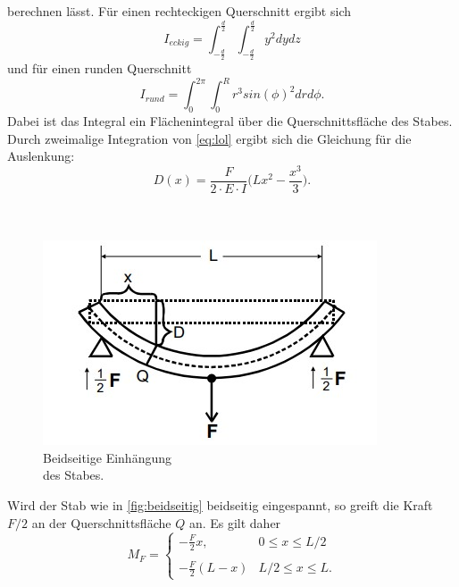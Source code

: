 berechnen lässt.
Für einen rechteckigen Querschnitt ergibt sich 
\begin{equation*}
    I_{eckig} =  \int_{-\frac{d}{2}}^{\frac{d}{2}}\int_{-\frac{d}{2}}^{\frac{d}{2}} y^2 dydz
\end{equation*}
und für einen runden Querschnitt
\begin{equation*}
    I_{rund} =  \int_{0}^{2π}\int_{0}^{R} r^3 sin(\phi)^2 drd\phi.
\end{equation*}
Dabei ist das Integral ein Flächenintegral über die Querschnittsfläche des Stabes.
Durch zweimalige Integration von \autoref{eq:lol} ergibt sich die Gleichung für die Auslenkung:
\begin{equation}\label{eq:ausgleich}
    D(x) = \frac{F}{2 \cdot E \cdot I} \biggl(Lx^2 - \frac{x^3}{3}\biggr).
\end{equation}
\\
\\
\begin{minipage}[4cm]{0.45\textwidth}
    \begin{figure}[H]
        \includegraphics[width=\linewidth]{img/abb4.jpg}
        \caption{Beidseitige Einhängung \\des Stabes.\cite{V103}}
        \label{fig:beidseitig}
    \end{figure}
    \vspace{10pt}
    \end{minipage}
    \begin{minipage}[4cm]{0.55\textwidth}
        Wird der Stab wie in \autoref{fig:beidseitig} beidseitig eingespannt, so greift die Kraft $F/2$ an der Querschnittsfläche $Q$ an.
        Es gilt daher
        \begin{equation*}
            M_F = 
            \begin{cases}
                -\frac{F}{2}x, & 0 \leq x \leq L/2 \\
                \\
                -\frac{F}{2}(L-x) & L/2 \leq x \leq L.
            \end{cases}
        \end{equation*}
        \vspace{10pt}
    \end{minipage}
